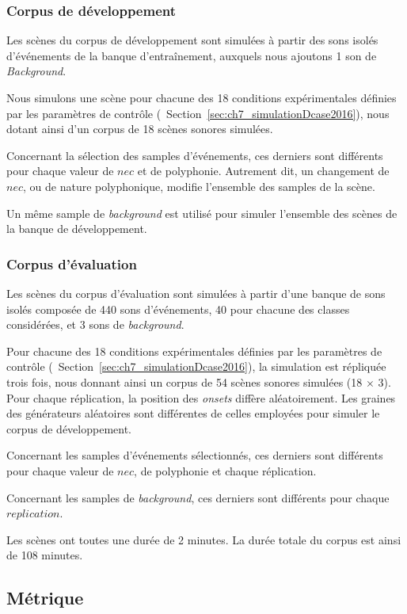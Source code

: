 \subsubsection{Corpus de développement}

Les scènes du corpus de développement sont simulées à partir des sons isolés d'événements de la banque d’entraînement, auxquels nous ajoutons 1 son de \emph{Background}.

Nous simulons une scène pour chacune des 18 conditions expérimentales définies par les paramètres de contrôle (\cf~Section~\ref{sec:ch7_simulationDcase2016}), nous dotant ainsi d'un corpus de 18 scènes sonores simulées.

Concernant la sélection des samples d'événements, ces derniers sont différents pour chaque valeur de $nec$ et de polyphonie. Autrement dit, un changement de $nec$, ou de nature polyphonique, modifie l'ensemble des samples de la scène. 

Un même sample de \emph{background} est utilisé pour simuler l'ensemble des scènes de la banque de développement.

\subsubsection{Corpus d'évaluation}

Les scènes du corpus d'évaluation sont simulées à partir d'une banque de sons isolés composée de 440 sons d'événements, 40 pour chacune des classes considérées, et 3 sons de \emph{background}.

Pour chacune des 18 conditions expérimentales définies par les paramètres de contrôle (\cf~Section~\ref{sec:ch7_simulationDcase2016}), la simulation est répliquée trois fois, nous donnant ainsi un corpus de 54 scènes sonores simulées (18 $\times$ 3). Pour chaque réplication, la position des \emph{onsets} diffère aléatoirement. Les graines des générateurs aléatoires sont différentes de celles employées pour simuler le corpus de développement.

Concernant les samples d'événements sélectionnés, ces derniers sont différents pour chaque valeur de $nec$, de polyphonie et chaque réplication. 
 
Concernant les samples de \emph{background}, ces derniers sont différents pour chaque $replication$. 

Les scènes ont toutes une durée de 2 minutes. La durée totale du corpus est ainsi de 108 minutes.

\subsection{Métrique}

